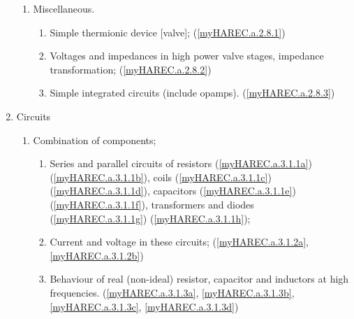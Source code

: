 \begin{enumerate}
\begin{enumerate}
\item Miscellaneous.
\begin{enumerate}
\item Simple thermionic device [valve];
  (\ref{myHAREC.a.2.8.1})\label{HAREC.a.2.8.1}
\item Voltages and impedances in high power valve stages,
  impedance transformation; (\ref{myHAREC.a.2.8.2})\label{HAREC.a.2.8.2}
\item Simple integrated circuits (include opamps).
  (\ref{myHAREC.a.2.8.3})\label{HAREC.a.2.8.3}
\end{enumerate}
\end{enumerate}

\item Circuits
\begin{enumerate}

\item Combination of components;
\begin{enumerate}
\item Series and parallel circuits of resistors
  (\ref{myHAREC.a.3.1.1a})\label{HAREC.a.3.1.1a}
  (\ref{myHAREC.a.3.1.1b})\label{HAREC.a.3.1.1b},
  coils
  (\ref{myHAREC.a.3.1.1c})\label{HAREC.a.3.1.1c}
  (\ref{myHAREC.a.3.1.1d})\label{HAREC.a.3.1.1d},
  capacitors
  (\ref{myHAREC.a.3.1.1e})\label{HAREC.a.3.1.1e}
  (\ref{myHAREC.a.3.1.1f})\label{HAREC.a.3.1.1f},
  transformers and diodes
  (\ref{myHAREC.a.3.1.1g})\label{HAREC.a.3.1.1g}
  (\ref{myHAREC.a.3.1.1h})\label{HAREC.a.3.1.1};
\item Current and voltage in these circuits;
  (\ref{myHAREC.a.3.1.2a}, \ref{myHAREC.a.3.1.2b})\label{HAREC.a.3.1.2}
\item Behaviour of real (non-ideal) resistor, capacitor and inductors at
  high frequencies.
  (\ref{myHAREC.a.3.1.3a}, \ref{myHAREC.a.3.1.3b}, \ref{myHAREC.a.3.1.3c},
  \ref{myHAREC.a.3.1.3d})\label{HAREC.a.3.1.3}
\end{enumerate}


\end{enumerate}
\end{enumerate}
